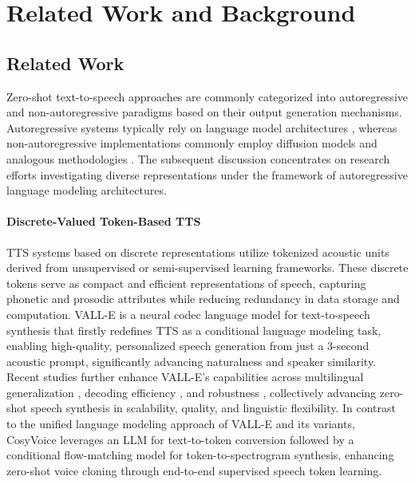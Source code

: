 \section{Related Work and Background}
\subsection{Related Work}
Zero-shot text-to-speech approaches are commonly categorized into autoregressive and non-autoregressive paradigms based on their output generation mechanisms. Autoregressive systems typically rely on language model architectures \citep{wang2023valle, kharitonov2023speak,yang2024interleaved}, whereas non-autoregressive implementations commonly employ diffusion models and analogous methodologies \citep{junaturalspeech, chen2024f5}. The subsequent discussion concentrates on research efforts investigating diverse representations under the framework of autoregressive language modeling architectures.


\paragraph{Discrete-Valued Token-Based TTS}
TTS systems based on discrete representations utilize tokenized acoustic units derived from unsupervised or semi-supervised learning frameworks. These discrete tokens serve as compact and efficient representations of speech, capturing phonetic and prosodic attributes while reducing redundancy in data storage and computation. VALL-E \citep{wang2023valle} is a neural codec language model for text-to-speech synthesis that firstly redefines TTS as a conditional language modeling task, enabling high-quality, personalized speech generation from just a 3-second acoustic prompt, significantly advancing naturalness and speaker similarity. Recent studies further enhance VALL-E’s capabilities across multilingual generalization \citep{zhang2023vallex}, decoding efficiency \citep{chen2024valle2}, and robustness \citep{song2024ellav,xin2024ralle,han2024valler}, collectively advancing zero-shot speech synthesis in scalability, quality, and linguistic flexibility. In contrast to the unified language modeling approach of VALL-E and its variants, CosyVoice \citep{du2024cosyvoice} leverages an LLM for text-to-token conversion followed by a conditional flow-matching model for token-to-spectrogram synthesis, enhancing zero-shot voice cloning through end-to-end supervised speech token learning.


